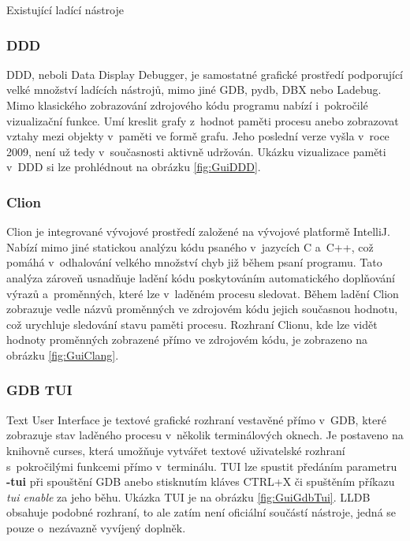 \documentclass[czech,bachelor,male,python,dept460,hidelinks]{diploma}						%
\begin{document}
\begin{section}{Existující ladící nástroje}
		\subsubsection{DDD}
			DDD, neboli Data Display Debugger, je samostatné grafické prostředí podporující velké množství ladících nástrojů, mimo jiné GDB, pydb, DBX nebo Ladebug.
			Mimo klasického zobrazování zdrojového kódu programu nabízí i~pokročilé vizualizační funkce. Umí kreslit grafy z~hodnot paměti procesu
			anebo zobrazovat vztahy mezi objekty v~paměti ve formě grafu. Jeho poslední verze vyšla v~roce 2009, není už tedy v~současnosti aktivně udržován.
			Ukázku vizualizace paměti v~DDD si lze prohlédnout na obrázku \ref{fig:GuiDDD}.
			
		
		\subsubsection{Clion}
		\label{ref:clion}
			Clion je integrované vývojové prostředí založené na vývojové platformě IntelliJ. Nabízí mimo jiné statickou analýzu kódu psaného v~jazycích
			C a~C++, což pomáhá v~odhalování velkého množství chyb již během psaní programu. Tato analýza zároveň usnadňuje ladění kódu poskytováním
			automatického doplňování výrazů a~proměnných, které lze v~laděném procesu sledovat. Během ladění Clion zobrazuje vedle názvů proměnných
			ve zdrojovém kódu jejich současnou hodnotu, což urychluje sledování stavu paměti procesu. Rozhraní Clionu, kde lze vidět hodnoty proměnných
			zobrazené přímo ve zdrojovém kódu, je zobrazeno na obrázku \ref{fig:GuiClang}.
			
		
		\subsubsection{GDB TUI}
			Text User Interface je textové grafické rozhraní vestavěné přímo v~GDB, které zobrazuje stav laděného procesu v~několik terminálových oknech.
			Je postaveno na knihovně curses, která umožňuje vytvářet textové uživatelské rozhraní s~pokročilými funkcemi přímo v~terminálu.
			TUI lze spustit předáním parametru \textbf{-tui} při spouštění GDB anebo stisknutím kláves CTRL+X či spuštěním příkazu \emph{tui enable} za jeho běhu.
			Ukázka TUI je na obrázku \ref{fig:GuiGdbTui}.
			LLDB obsahuje podobné rozhraní, to ale zatím není oficiální součástí nástroje, jedná se pouze o~nezávazně vyvíjený doplněk.
			
			
\end{section}
\end{document}
